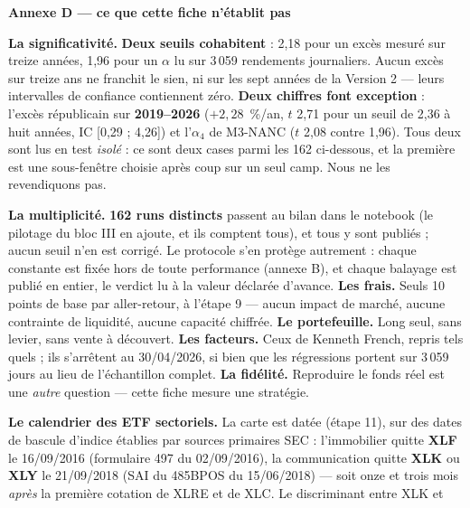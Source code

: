 \documentclass[9pt,a4paper]{extarticle}
\begin{document}
\vspace{0.8mm}
{\color{bleu}\bfseries Annexe D --- ce que cette fiche n'établit pas}\par
\vspace{0.6mm}
{\footnotesize
\textbf{La significativité.} \textbf{Deux seuils cohabitent} : 2,18 pour un excès mesuré sur treize années,
1,96 pour un $\alpha$ lu sur 3\,059 rendements journaliers. Aucun excès sur treize ans ne franchit le sien, ni
sur les sept années de la Version 2 --- leurs intervalles de confiance contiennent zéro. \textbf{Deux chiffres
font exception} : l'excès républicain sur \textbf{2019--2026} ($+2{,}28$~\%/an, $t$ 2,71 pour un seuil de 2,36
à huit années, IC [0,29 ; 4,26]) et l'$\alpha_4$ de M3-NANC ($t$ 2,08 contre 1,96). Tous deux sont lus en test
\emph{isolé} : ce sont deux cases parmi les 162 ci-dessous, et la première est une sous-fenêtre choisie après
coup sur un seul camp. Nous ne les revendiquons pas.\par
\vspace{0.5mm}
\textbf{La multiplicité.} \textbf{162 runs distincts} passent au bilan dans le notebook (le pilotage du
bloc III en ajoute, et ils comptent tous), et tous y sont publiés ;
aucun seuil n'en est corrigé. Le protocole s'en protège autrement : chaque constante est fixée hors de toute
performance (annexe B), et chaque balayage est publié en entier, le verdict lu à la valeur déclarée d'avance.
\textbf{Les frais.} Seuls 10 points de base par aller-retour, à l'étape 9 --- aucun impact de marché, aucune
contrainte de liquidité, aucune capacité chiffrée. \textbf{Le portefeuille.} Long seul, sans levier, sans
vente à découvert. \textbf{Les facteurs.} Ceux de Kenneth French, repris tels quels ; ils s'arrêtent au
30/04/2026, si bien que les régressions portent sur 3\,059 jours au lieu de l'échantillon complet.
\textbf{La fidélité.} Reproduire le fonds réel est une \emph{autre} question --- cette fiche mesure une
stratégie.\par
\vspace{0.5mm}
\textbf{Le calendrier des ETF sectoriels.} La carte est datée (étape 11), sur des dates de bascule d'indice
établies par sources primaires SEC : l'immobilier quitte \textbf{XLF} le 16/09/2016 (formulaire 497 du
02/09/2016), la communication quitte \textbf{XLK} ou \textbf{XLY} le 21/09/2018 (SAI du 485BPOS du 15/06/2018)
--- soit onze et trois mois \emph{après} la première cotation de XLRE et de XLC. Le discriminant entre XLK et
}
\end{document}
